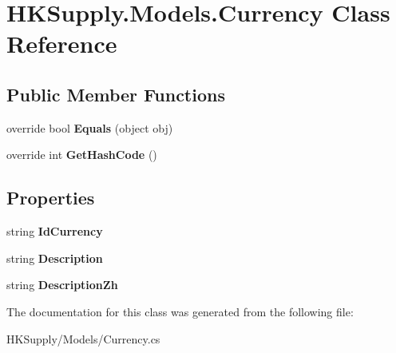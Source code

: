 \hypertarget{class_h_k_supply_1_1_models_1_1_currency}{}\section{H\+K\+Supply.\+Models.\+Currency Class Reference}
\label{class_h_k_supply_1_1_models_1_1_currency}
\subsection*{Public Member Functions}
\begin{DoxyCompactItemize}
\item 
\mbox{\label{class_h_k_supply_1_1_models_1_1_currency_a30afba9ddba7a1577ebfb6a7187b42ad}} 
override bool {\bfseries Equals} (object obj)
\item 
\mbox{\label{class_h_k_supply_1_1_models_1_1_currency_acdddcab9581d6b539aee29a5dc3433c0}} 
override int {\bfseries Get\+Hash\+Code} ()
\end{DoxyCompactItemize}
\subsection*{Properties}
\begin{DoxyCompactItemize}
\item 
\mbox{\label{class_h_k_supply_1_1_models_1_1_currency_a6bc39edf2b040617017733909e48031a}} 
string {\bfseries Id\+Currency}
\item 
\mbox{\label{class_h_k_supply_1_1_models_1_1_currency_aec25256c73bb4f718688cba19febcb5c}} 
string {\bfseries Description}
\item 
\mbox{\label{class_h_k_supply_1_1_models_1_1_currency_ac97c2ef20b77e0a737bf08117babe1f4}} 
string {\bfseries Description\+Zh}
\end{DoxyCompactItemize}


The documentation for this class was generated from the following file\+:\begin{DoxyCompactItemize}
\item 
H\+K\+Supply/\+Models/Currency.\+cs\end{DoxyCompactItemize}
